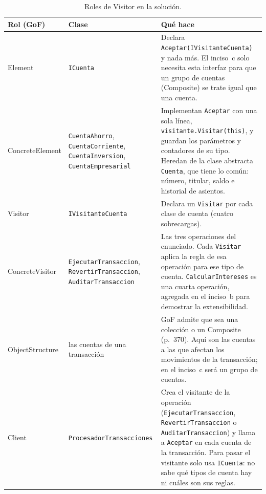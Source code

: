 \begin{table}[H]
\centering
\small
\begin{tabularx}{\textwidth}{>{\raggedright\arraybackslash}p{2.9cm}
                             >{\raggedright\arraybackslash}p{4.6cm}
                             >{\raggedright\arraybackslash}X}
\toprule
\textbf{Rol (GoF)} & \textbf{Clase} & \textbf{Qué hace} \\
\midrule
Element & \texttt{ICuenta}
  & Declara \texttt{Aceptar(IVisitanteCuenta)} y nada más. El inciso~c solo necesita esta
    interfaz para que un grupo de cuentas (Composite) se trate igual que una cuenta. \\
\addlinespace
ConcreteElement & \texttt{CuentaAhorro}, \texttt{CuentaCorriente}, \texttt{CuentaInversion},
                  \texttt{CuentaEmpresarial}
  & Implementan \texttt{Aceptar} con una sola línea, \texttt{visitante.Visitar(this)}, y
    guardan los parámetros y contadores de su tipo. Heredan de la clase abstracta
    \texttt{Cuenta}, que tiene lo común: número, titular, saldo e historial de asientos. \\
\addlinespace
Visitor & \texttt{IVisitanteCuenta}
  & Declara un \texttt{Visitar} por cada clase de cuenta (cuatro sobrecargas). \\
\addlinespace
ConcreteVisitor & \texttt{EjecutarTransaccion}, \texttt{RevertirTransaccion},
                  \texttt{AuditarTransaccion}
  & Las tres operaciones del enunciado. Cada \texttt{Visitar} aplica la regla de esa
    operación para ese tipo de cuenta. \texttt{CalcularIntereses} es una cuarta operación,
    agregada en el inciso~b para demostrar la extensibilidad. \\
\addlinespace
ObjectStructure & las cuentas de una transacción
  & GoF admite que sea una colección o un Composite (p.~370). Aquí son las cuentas a las que
    afectan los movimientos de la transacción; en el inciso~c será un grupo de cuentas. \\
\addlinespace
Client & \texttt{ProcesadorTransacciones}
  & Crea el visitante de la operación (\texttt{EjecutarTransaccion},
    \texttt{RevertirTransaccion} o \texttt{AuditarTransaccion}) y llama a \texttt{Aceptar} en
    cada cuenta de la transacción. Para pasar el visitante solo usa \texttt{ICuenta}: no sabe
    qué tipos de cuenta hay ni cuáles son sus reglas. \\
\bottomrule
\end{tabularx}
\caption{Roles de Visitor en la solución.}
\end{table}

